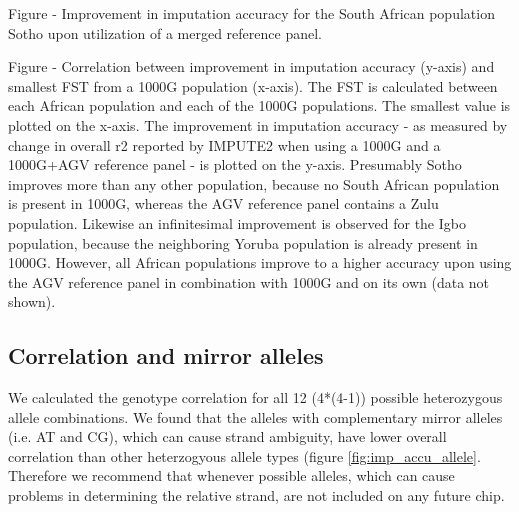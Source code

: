 Figure - Improvement in imputation accuracy for the South African population Sotho upon utilization of a merged reference panel.

Figure - Correlation between improvement in imputation accuracy (y-axis) and smallest FST from a 1000G population (x-axis). The FST is calculated between each African population and each of the 1000G populations. The smallest value is plotted on the x-axis. The improvement in imputation accuracy - as measured by change in overall r2 reported by IMPUTE2 when using a 1000G and a 1000G+AGV reference panel - is plotted on the y-axis. Presumably Sotho improves more than any other population, because no South African population is present in 1000G, whereas the AGV reference panel contains a Zulu population. Likewise an infinitesimal improvement is observed for the Igbo population, because the neighboring Yoruba population is already present in 1000G. However, all African populations improve to a higher accuracy upon using the AGV reference panel in combination with 1000G and on its own (data not shown).

\subsection{Correlation and mirror alleles}
We calculated the genotype correlation for all 12 (4*(4-1)) possible heterozygous allele combinations. We found that the alleles with complementary mirror alleles (i.e. AT and CG), which can cause strand ambiguity, have lower overall correlation than other heterzogyous allele types (figure \ref{fig:imp_accu_allele}. Therefore we recommend that whenever possible alleles, which can cause problems in determining the relative strand, are not included on any future chip.

